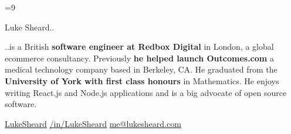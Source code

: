 \documentclass{article}
\begin{document}
\color{body}

=9\relax     %

\raggedright

\fontsize{10pt}{13pt}\selectfont


\begin{minipage}[t]{\textwidth}
  {\Huge
    Luke Sheard..
  }

  {\vspace{10pt}
    ..is a British \textbf{software engineer at Redbox Digital} in London, a global ecommerce consultancy. Previously \textbf{he helped launch Outcomes.com} a medical technology company based in Berkeley, CA. He graduated from the \textbf{University of York with first class honours} in Mathematics. He enjoys writing React.js and Node.js applications and is a big advocate of open source software.
  }

  \vspace{5pt}

  \faGithub
  \hspace{3pt}
  \href{https://www.github.com/LukeSheard}{LukeSheard}
  \hspace{20pt}
  \faLinkedin
  \hspace{3pt}
  \href{http://www.linkedin.com/in/lukesheard}{/in/LukeSheard}
  \hspace{20pt}
  \faEnvelope
  \hspace{3pt}
  \href{mailto:me@lukesheard.com}{me@lukesheard.com}

  \vspace{20pt}
\end{minipage}
\end{document}
